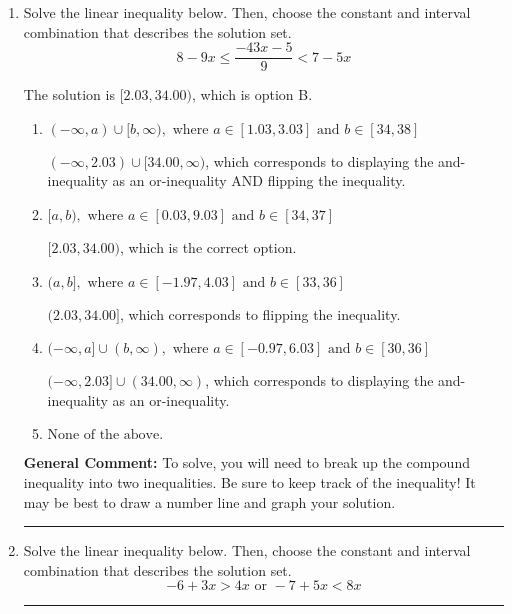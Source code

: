 \documentclass{extbook}[14pt]
\newcommand{\litem}[1]{\item #1

\rule{\textwidth}{0.4pt}}
\begin{document}
\begin{enumerate}
{\begin{enumerate}[label=\Alph*.]
Corresponds to inverting the inequality and negating the solution.
\item \( (-\infty, a] \cup [b, \infty), \text{ where } a \in [-0.71, 3.29] \text{ and } b \in [6, 11] \)

Corresponds to including the endpoints AND negating.
\item \( (-\infty, a] \cup [b, \infty), \text{ where } a \in [-12, -6] \text{ and } b \in [-3.29, 0.71] \)

Corresponds to including the endpoints (when they should be excluded).
\item \( (-\infty, \infty) \)

Corresponds to the variable canceling, which does not happen in this instance.
\end{enumerate}

\textbf{General Comment:} When multiplying or dividing by a negative, flip the sign.
}
\litem{
Solve the linear inequality below. Then, choose the constant and interval combination that describes the solution set.
\[ 8 - 9 x \leq \frac{-43 x - 5}{9} < 7 - 5 x \]

The solution is \( [2.03, 34.00) \), which is option B.\begin{enumerate}[label=\Alph*.]
\item \( (-\infty, a) \cup [b, \infty), \text{ where } a \in [1.03, 3.03] \text{ and } b \in [34, 38] \)

$(-\infty, 2.03) \cup [34.00, \infty)$, which corresponds to displaying the and-inequality as an or-inequality AND flipping the inequality.
\item \( [a, b), \text{ where } a \in [0.03, 9.03] \text{ and } b \in [34, 37] \)

$[2.03, 34.00)$, which is the correct option.
\item \( (a, b], \text{ where } a \in [-1.97, 4.03] \text{ and } b \in [33, 36] \)

$(2.03, 34.00]$, which corresponds to flipping the inequality.
\item \( (-\infty, a] \cup (b, \infty), \text{ where } a \in [-0.97, 6.03] \text{ and } b \in [30, 36] \)

$(-\infty, 2.03] \cup (34.00, \infty)$, which corresponds to displaying the and-inequality as an or-inequality.
\item \( \text{None of the above.} \)


\end{enumerate}

\textbf{General Comment:} To solve, you will need to break up the compound inequality into two inequalities. Be sure to keep track of the inequality! It may be best to draw a number line and graph your solution.
}
\litem{
Solve the linear inequality below. Then, choose the constant and interval combination that describes the solution set.
\[ -6 + 3 x > 4 x \text{ or } -7 + 5 x < 8 x \]

}
\end{enumerate}
\end{document}
